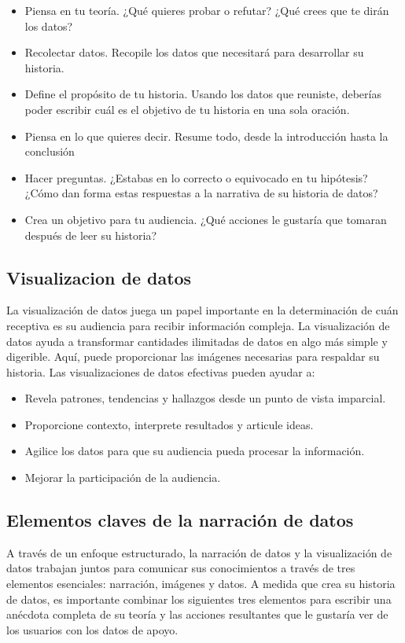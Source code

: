 \documentclass[twoside,twocolumn]{article}
\begin{document}
\begin{itemize}
    \item   Piensa en tu teoría. ¿Qué quieres probar o refutar? ¿Qué crees que te dirán los datos?
    \item   Recolectar datos. Recopile los datos que necesitará para desarrollar su historia. 
    \item   Define el propósito de tu historia. Usando los datos que reuniste, deberías poder escribir cuál es el objetivo de tu historia en una sola oración. 
    \item   Piensa en lo que quieres decir. Resume todo, desde la introducción hasta la conclusión 
    \item   Hacer preguntas. ¿Estabas en lo correcto o equivocado en tu hipótesis? ¿Cómo dan forma estas respuestas a la narrativa de su historia de datos? 
    \item   Crea un objetivo para tu audiencia. ¿Qué acciones le gustaría que tomaran después de leer su historia?
\end{itemize}

\subsection{Visualizacion de datos}
La visualización de datos juega un papel importante en 
la determinación de cuán receptiva es su audiencia 
para recibir información compleja. La visualización 
de datos ayuda a transformar cantidades ilimitadas de 
datos en algo más simple y digerible. Aquí, puede 
proporcionar las imágenes necesarias para respaldar 
su historia. Las visualizaciones de datos efectivas 
pueden ayudar a:
\begin{itemize}
    \item   Revela patrones, tendencias y hallazgos desde un punto de vista imparcial. 
    \item   Proporcione contexto, interprete resultados y articule ideas. 
    \item   Agilice los datos para que su audiencia pueda procesar la información.
    \item   Mejorar la participación de la audiencia.
\end{itemize}

\subsection{Elementos claves de la narración de datos}
A través de un enfoque estructurado, la narración de datos y 
la visualización de datos trabajan juntos para comunicar sus 
conocimientos a través de tres elementos esenciales: narración, 
imágenes y datos. A medida que crea su historia de datos, es 
importante combinar los siguientes tres elementos para escribir 
una anécdota completa de su teoría y las acciones resultantes que 
le gustaría ver de los usuarios con los datos de apoyo.
\end{document}
